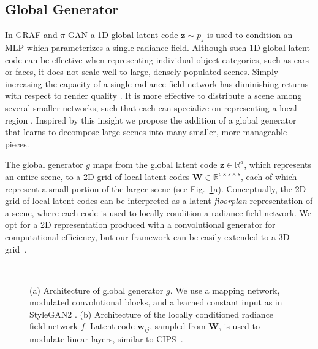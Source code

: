 \documentclass[10pt,twocolumn,letterpaper]{article}
\begin{document}
\subsection{Global Generator}

In GRAF \cite{graf} and $\pi$-GAN \cite{pigan} a 1D global latent code $\textbf{z}\sim p_z$ is used to condition an MLP which parameterizes a single radiance field. Although such 1D global latent code can be effective when representing individual object categories, such as cars or faces, it does not scale well to large, densely populated scenes. Simply increasing the capacity of a single radiance field network has diminishing returns with respect to render quality \cite{derf}. It is more effective to distribute a scene among several smaller networks, such that each can specialize on representing a local region \cite{derf}. Inspired by this insight we propose the addition of a global generator that learns to decompose large scenes into many smaller, more manageable pieces.

The global generator $g$ maps from the global latent code $\textbf{z} \in  \mathbb{R}^d $, which represents an entire scene, to a 2D grid of local latent codes $\textbf{W} \in \mathbb{R}^{c \times s \times s}$, each of which represent a small portion of the larger scene (see Fig.~\ref{fig:global_generator}a). Conceptually, the 2D grid of local latent codes can be interpreted as a latent \textit{floorplan} representation of a scene, where each code is used to locally condition a radiance field network. We opt for a 2D representation produced with a convolutional generator for computational efficiency, but our framework can be easily extended to a 3D grid~\cite{nsvf}. 

\begin{figure}[t]
    \centering
    \hspace{0.4cm}
    \\
    \vspace{0.3cm}
    \caption{(a) Architecture of global generator $g$. We use a mapping network, modulated convolutional blocks, and a learned constant input as in StyleGAN2 \cite{stylegan2}. (b) Architecture of the locally conditioned radiance field network $f$. Latent code $\textbf{w}_{ij}$, sampled from $\textbf{W}$, is used to modulate linear layers, similar to CIPS~\cite{modfc}.}
    \label{fig:global_generator}
\end{figure}
\end{document}

